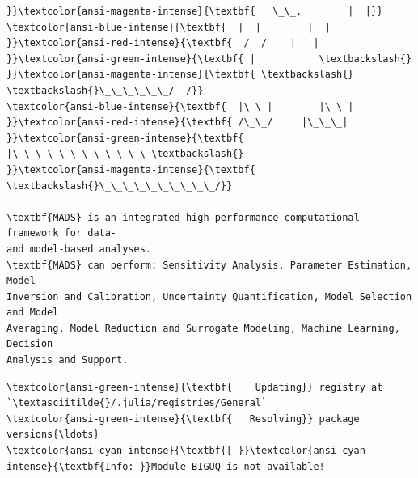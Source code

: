 \documentclass[11pt]{article}
\begin{document}
\begin{Verbatim}[commandchars=\\\{\}]
}}\textcolor{ansi-magenta-intense}{\textbf{   \_\_.        |  |}}
\textcolor{ansi-blue-intense}{\textbf{  |  |        |  | }}\textcolor{ansi-red-intense}{\textbf{  /  /    |   | }}\textcolor{ansi-green-intense}{\textbf{ |           \textbackslash{}
}}\textcolor{ansi-magenta-intense}{\textbf{ \textbackslash{}  \textbackslash{}\_\_\_\_\_\_/  /}}
\textcolor{ansi-blue-intense}{\textbf{  |\_\_|        |\_\_| }}\textcolor{ansi-red-intense}{\textbf{ /\_\_/     |\_\_\_| }}\textcolor{ansi-green-intense}{\textbf{ |\_\_\_\_\_\_\_\_\_\_\_\_\textbackslash{}
}}\textcolor{ansi-magenta-intense}{\textbf{  \textbackslash{}\_\_\_\_\_\_\_\_\_\_/}}

\textbf{MADS} is an integrated high-performance computational framework for data-
and model-based analyses.
\textbf{MADS} can perform: Sensitivity Analysis, Parameter Estimation, Model
Inversion and Calibration, Uncertainty Quantification, Model Selection and Model
Averaging, Model Reduction and Surrogate Modeling, Machine Learning, Decision
Analysis and Support.
    \end{Verbatim}

    \begin{Verbatim}[commandchars=\\\{\}]
\textcolor{ansi-green-intense}{\textbf{    Updating}} registry at `\textasciitilde{}/.julia/registries/General`
\textcolor{ansi-green-intense}{\textbf{   Resolving}} package versions{\ldots}
\textcolor{ansi-cyan-intense}{\textbf{[ }}\textcolor{ansi-cyan-intense}{\textbf{Info: }}Module BIGUQ is not available!
    \end{Verbatim}
\end{document}
